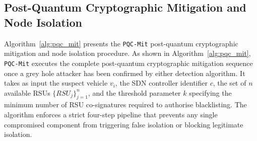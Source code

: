 \documentclass[12pt, a4paper]{report}
\begin{document}
\subsection{Post-Quantum Cryptographic Mitigation and Node Isolation}

Algorithm~\ref{alg:pqc_mit} presents the \texttt{PQC-Mit} post-quantum cryptographic mitigation and node isolation procedure. As shown in Algorithm~\ref{alg:pqc_mit},
\texttt{PQC-Mit} executes the complete post-quantum cryptographic
mitigation sequence once a grey hole attacker has been confirmed
by either detection algorithm. It takes as input the suspect
vehicle $v_i$, the SDN controller identifier $c$, the set of $n$ available
RSUs $\{RSU_j\}_{j=1}^{n}$, and the threshold parameter $k$ specifying the
minimum number of RSU co-signatures required to authorise blacklisting. The
algorithm enforces a strict four-step pipeline that prevents any single
compromised component from triggering false isolation or blocking legitimate
isolation.
\end{document}
